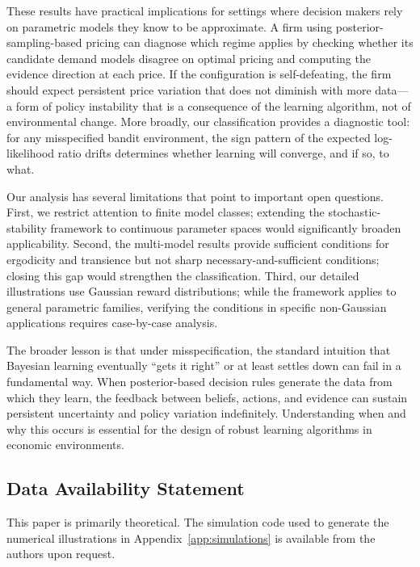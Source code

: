\documentclass[12pt]{article}
\begin{document}
These results have practical implications for settings where decision makers rely on parametric models they know to be approximate. A firm using posterior-sampling-based pricing can diagnose which regime applies by checking whether its candidate demand models disagree on optimal pricing and computing the evidence direction at each price. If the configuration is self-defeating, the firm should expect persistent price variation that does not diminish with more data---a form of policy instability that is a consequence of the learning algorithm, not of environmental change. More broadly, our classification provides a diagnostic tool: for any misspecified bandit environment, the sign pattern of the expected log-likelihood ratio drifts determines whether learning will converge, and if so, to what.

Our analysis has several limitations that point to important open questions. First, we restrict attention to finite model classes; extending the stochastic-stability framework to continuous parameter spaces would significantly broaden applicability. Second, the multi-model results provide sufficient conditions for ergodicity and transience but not sharp necessary-and-sufficient conditions; closing this gap would strengthen the classification. Third, our detailed illustrations use Gaussian reward distributions; while the framework applies to general parametric families, verifying the conditions in specific non-Gaussian applications requires case-by-case analysis.

The broader lesson is that under misspecification, the standard intuition that Bayesian learning eventually ``gets it right'' or at least settles down can fail in a fundamental way. When posterior-based decision rules generate the data from which they learn, the feedback between beliefs, actions, and evidence can sustain persistent uncertainty and policy variation indefinitely. Understanding when and why this occurs is essential for the design of robust learning algorithms in economic environments.


\subsection*{Data Availability Statement}
This paper is primarily theoretical. The simulation code used to generate the numerical illustrations in Appendix~\ref{app:simulations} is available from the authors upon request.

\newpage
\setlength{\bibsep}{0.5ex}


\end{document}
